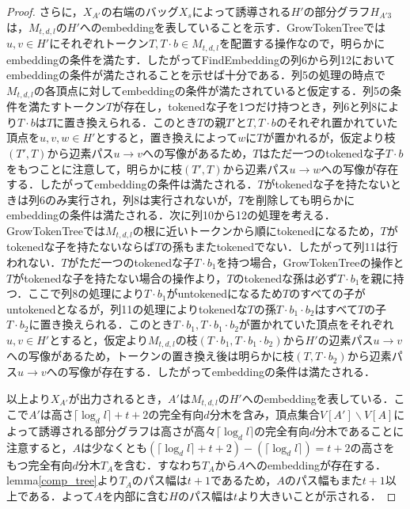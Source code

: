 \documentclass[master]{kuisthesis}		%
\theoremstyle{plain}
\theoremstyle{definition}
\begin{document}
\begin{proof}
さらに，$X_{A'}$の右端のバッグ$X_s$によって誘導される$H'$の部分グラフ$H_{A'3}$は，$M_{t, d, l}$の$H'$へのembeddingを表していることを示す．GrowTokenTreeでは$u, v \in H'$にそれぞれトークン$T, T\cdot b \in M_{t, d, l}$を配置する操作なので，明らかにembeddingの条件を満たす．したがってFindEmbeddingの列6から列12においてembeddingの条件が満たされることを示せば十分である．列5の処理の時点で$M_{t, d, l}$の各頂点に対してembeddingの条件が満たされていると仮定する．列5の条件を満たすトークン$T$が存在し，tokenedな子を1つだけ持つとき，列6と列8により$T \cdot b$は$T$に置き換えられる．このとき$T$の親$T'$と$T, T \cdot b$のそれぞれ置かれていた頂点を$u, v, w \in H'$とすると，置き換えによって$w$に$T$が置かれるが，仮定より枝$(T', T)$から辺素パス$u \rightarrow v$への写像があるため，$T$はただ一つのtokenedな子$T \cdot b$をもつことに注意して，明らかに枝$(T', T)$から辺素パス$u \rightarrow w$への写像が存在する．したがってembeddingの条件は満たされる．$T$がtokenedな子を持たないときは列6のみ実行され，列8は実行されないが，$T$を削除しても明らかにembeddingの条件は満たされる．次に列10から12の処理を考える．GrowTokenTreeでは$M_{t, d, l}$の根に近いトークンから順にtokenedになるため，$T$がtokenedな子を持たないならば$T$の孫もまたtokenedでない．したがって列11は行われない．$T$がただ一つのtokenedな子$T \cdot b_1$を持つ場合，GrowTokenTreeの操作と$T$がtokenedな子を持たない場合の操作より，$T$のtokenedな孫は必ず$T \cdot b_1$を親に持つ．ここで列8の処理により$T \cdot b_1$がuntokenedになるため$T$のすべての子がuntokenedとなるが，列11の処理によりtokenedな$T$の孫$T \cdot b_1 \cdot b_2$はすべて$T$の子$T \cdot b_2$に置き換えられる．このとき$T \cdot b_1, T \cdot b_1 \cdot b_2$が置かれていた頂点をそれぞれ$u, v \in H'$とすると，仮定より$M_{t, d, l}$の枝$(T \cdot b_1, T \cdot b_1 \cdot b_2)$から$H'$の辺素パス$u \rightarrow v$への写像があるため，トークンの置き換え後は明らかに枝$(T, T \cdot b_2)$から辺素パス$u \rightarrow v$への写像が存在する．したがってembeddingの条件は満たされる．

以上より$X_{A'}$が出力されるとき，$A'$は$M_{t, d, l}$の$H'$へのembeddingを表している．ここで$A'$は高さ$\lceil \log_d l \rceil +t+2$の完全有向$d$分木を含み，頂点集合$V[A'] \backslash V[A]$によって誘導される部分グラフは高さが高々$\lceil \log_d l \rceil$の完全有向$d$分木であることに注意すると，$A$は少なくとも$(\lceil \log_d l \rceil +t+2) -(\lceil \log_d l \rceil) = t+2$の高さをもつ完全有向$d$分木$T_A$を含む．すなわち$T_A$から$A$へのembeddingが存在する．lemma\ref{comp_tree}より$T_A$のパス幅は$t+1$であるため，$A$のパス幅もまた$t+1$以上である．よって$A$を内部に含む$H$のパス幅は$t$より大きいことが示される．


\end{proof}
\end{document}
